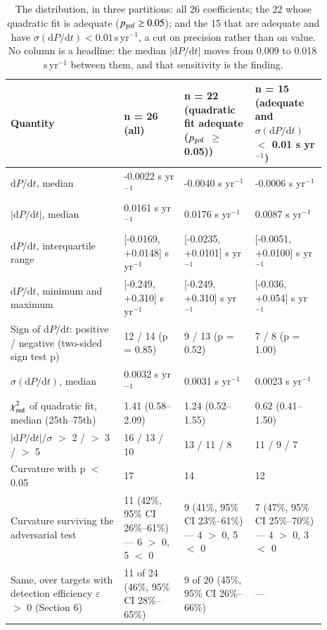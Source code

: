 \documentclass{aa}
\begin{document}
\begin{table}
\caption{The distribution, in three partitions: all 26 coefficients; the 22 whose quadratic fit is adequate ($p_{\rm gof}\ge0.05$); and the 15 that are adequate and have $\sigma(\mathrm{d}P/\mathrm{d}t)<0.01$\,s\,yr$^{-1}$, a cut on precision rather than on value. No column is a headline: the median $|\mathrm{d}P/\mathrm{d}t|$ moves from 0.009 to 0.018\,s\,yr$^{-1}$ between them, and that sensitivity is the finding.}
\label{t:dist}
\centering
\begin{tabular}{p{0.32\linewidth} p{0.17\linewidth} p{0.20\linewidth} p{0.20\linewidth}}
\hline\hline
Quantity & n = 26 (all) & n = 22 (quadratic fit adequate ($p_{\rm gof}$ $\ge$ 0.05)) & n = 15 (adequate and $\sigma(\mathrm{d}P/\mathrm{d}t)$ $<$ 0.01 s yr$^{-1}$)\\
\hline
$\mathrm{d}P/\mathrm{d}t$, median & -0.0022 s yr$^{-1}$ & -0.0040 s yr$^{-1}$ & -0.0006 s yr$^{-1}$\\
$|\mathrm{d}P/\mathrm{d}t|$, median & 0.0161 s yr$^{-1}$ & 0.0176 s yr$^{-1}$ & 0.0087 s yr$^{-1}$\\
$\mathrm{d}P/\mathrm{d}t$, interquartile range & [-0.0169, +0.0148] s yr$^{-1}$ & [-0.0235, +0.0101] s yr$^{-1}$ & [-0.0051, +0.0100] s yr$^{-1}$\\
$\mathrm{d}P/\mathrm{d}t$, minimum and maximum & [-0.249, +0.310] s yr$^{-1}$ & [-0.249, +0.310] s yr$^{-1}$ & [-0.036, +0.054] s yr$^{-1}$\\
Sign of $\mathrm{d}P/\mathrm{d}t$: positive / negative (two-sided sign test p) & 12 / 14 (p = 0.85) & 9 / 13 (p = 0.52) & 7 / 8 (p = 1.00)\\
$\sigma(\mathrm{d}P/\mathrm{d}t)$, median & 0.0032 s yr$^{-1}$ & 0.0031 s yr$^{-1}$ & 0.0023 s yr$^{-1}$\\
$\chi^2_{\rm red}$ of quadratic fit, median (25th--75th) & 1.41 (0.58--2.09) & 1.24 (0.52--1.55) & 0.62 (0.41--1.50)\\
$|\mathrm{d}P/\mathrm{d}t|/\sigma$ $>$ 2 / $>$ 3 / $>$ 5 & 16 / 13 / 10 & 13 / 11 / 8 & 11 / 9 / 7\\
Curvature with p $<$ 0.05 & 17 & 14 & 12\\
Curvature surviving the adversarial test & 11 (42\%, 95\% CI 26\%--61\%) --- 6 $>$ 0, 5 $<$ 0 & 9 (41\%, 95\% CI 23\%--61\%) --- 4 $>$ 0, 5 $<$ 0 & 7 (47\%, 95\% CI 25\%--70\%) --- 4 $>$ 0, 3 $<$ 0\\
Same, over targets with detection efficiency $\varepsilon$ $>$ 0 (Section 6) & 11 of 24 (46\%, 95\% CI 28\%--65\%) & 9 of 20 (45\%, 95\% CI 26\%--66\%) & ---\\

\end{tabular}
\end{table}
\end{document}
